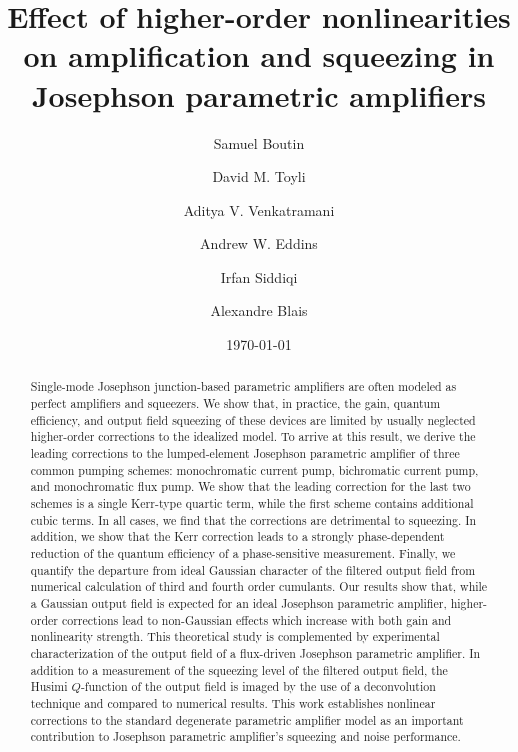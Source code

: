 \documentclass[pra,twocolumn,superscriptaddress]{revtex4-1}
\begin{document}
\title{Effect of higher-order nonlinearities on amplification and squeezing in Josephson parametric amplifiers}

\author{Samuel Boutin}
\author{David M. Toyli} 
\author{ Aditya V. Venkatramani }
\author{  Andrew W. Eddins }
\author{  Irfan Siddiqi }
\author{Alexandre Blais}

\date{\today}                                       
\begin{abstract}
Single-mode Josephson junction-based parametric amplifiers are often modeled as perfect amplifiers and squeezers. We show that, in practice, the gain, quantum efficiency, and output field squeezing of these devices are limited by usually neglected higher-order corrections to the idealized model. To arrive at this result, we derive the leading corrections to the lumped-element Josephson parametric amplifier of three common pumping schemes: monochromatic current pump, bichromatic current pump, and monochromatic flux pump. We show that the leading correction for the last two schemes is a single Kerr-type quartic term, while the first scheme contains additional cubic terms. In all cases, we find that the corrections are detrimental to squeezing. In addition, we show that the Kerr correction leads to a strongly phase-dependent reduction of the quantum efficiency of a phase-sensitive measurement. Finally, we quantify the departure from ideal Gaussian character of the filtered output field from numerical calculation of third and fourth order cumulants. Our results show that, while a Gaussian output field is expected for an ideal Josephson parametric amplifier, higher-order corrections lead to non-Gaussian effects which increase with both gain and nonlinearity strength.
This theoretical study is complemented by experimental characterization of the output field of a flux-driven Josephson parametric amplifier. 
In addition to a measurement of the squeezing level of the filtered output field, the Husimi $Q$-function of the output field is imaged by the use of a deconvolution technique and compared to numerical results. 
This work establishes nonlinear corrections to the standard degenerate parametric amplifier model as an important contribution to Josephson parametric amplifier's squeezing and noise performance.
% 
\end{abstract}
\end{document}
